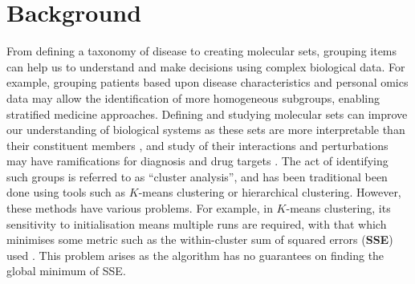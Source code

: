 \documentclass{bmcart}
\begin{document}
\section*{Background}

From defining a taxonomy of disease to creating molecular sets, grouping items can help us to understand and make decisions using complex biological data. For example, grouping patients based upon disease characteristics and personal omics data may allow the identification of more homogeneous subgroups, enabling stratified medicine approaches. Defining and studying molecular sets can improve our understanding of biological systems as these sets are more interpretable than their constituent members \citep{hejblum2015time}, and study of their interactions and perturbations may have ramifications for diagnosis and drug targets \citep{bai2013strategic, emmert2014gene}. 
 The act of identifying such groups is referred to as “cluster analysis”, and has been traditional been done using tools such as $K$-means clustering \citep{lloyd1982least, forgy1965cluster} or hierarchical clustering. However, these methods have various problems. For example, in $K$-means clustering, its sensitivity to initialisation means multiple runs are required, with that which minimises some metric such as the within-cluster sum of squared errors (\textbf{SSE}) used \citep{arthur2006k}.
This problem arises as the algorithm has no guarantees on finding the global minimum of SSE. 
\end{document}

